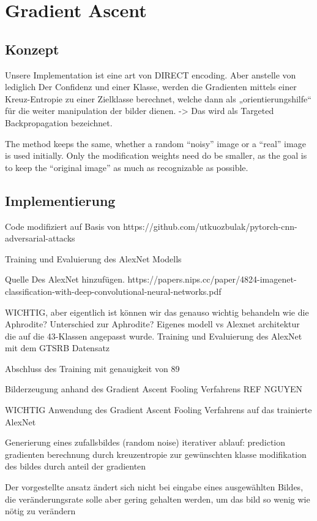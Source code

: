 \chapter{Gradient Ascent}
\label{cha:gascent}
\section{Konzept}
Unsere Implementation ist eine art von DIRECT encoding. Aber anstelle von lediglich Der Confidenz und einer Klasse, werden die Gradienten mittels einer Kreuz-Entropie zu einer Zielklasse berechnet, welche dann als „orientierungshilfe“ für die weiter manipulation der bilder dienen. -> Das wird als Targeted Backpropagation bezeichnet.


The method keeps the same, whether a random “noisy” image or a “real” image is used initially. Only the modification weights need do be smaller, as the goal is to keep the “original image” as much as recognizable as possible.

\section{Implementierung}
Code modifiziert auf Basis von https://github.com/utkuozbulak/pytorch-cnn-adversarial-attacks


Training und Evaluierung des AlexNet Modells

Quelle Des AlexNet hinzufügen.
https://papers.nips.cc/paper/4824-imagenet-classification-with-deep-convolutional-neural-networks.pdf

WICHTIG, aber eigentlich ist können wir das genauso wichtig behandeln wie die Aphrodite?
Unterschied zur Aphrodite? Eigenes modell vs Alexnet architektur die auf die 43-Klassen angepasst wurde. 
Training und Evaluierung des AlexNet mit dem GTSRB Datensatz

Abschluss des Training mit genauigkeit von 89%


Bilderzeugung anhand des Gradient Ascent Fooling Verfahrens REF NGUYEN

WICHTIG
Anwendung des Gradient Ascent Fooling Verfahrens auf das trainierte AlexNet


Generierung eines zufallsbildes (random noise)
iterativer ablauf: 
prediction
gradienten berechnung durch kreuzentropie zur gewünschten klasse
modifikation des bildes durch anteil der gradienten 

Der vorgestellte ansatz ändert sich nicht bei eingabe eines ausgewählten Bildes, die veränderungsrate solle aber gering gehalten werden, um das bild so wenig wie nötig zu verändern

